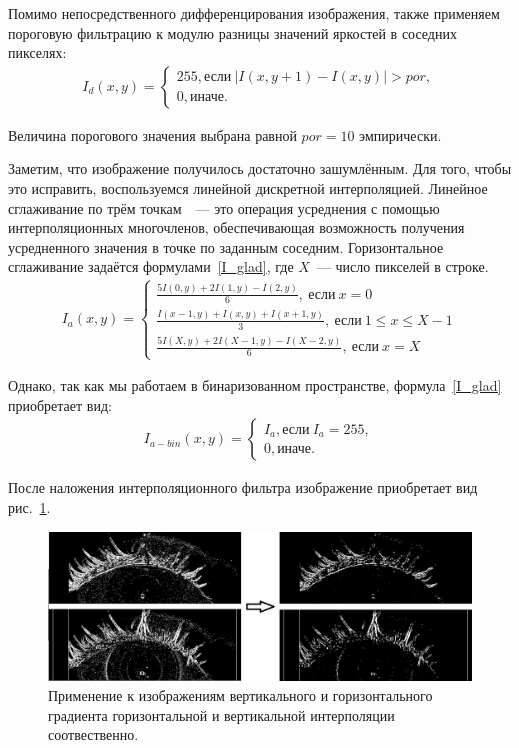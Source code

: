 \documentclass[12pt,a4paper]{article} %
\begin{document}
Помимо непосредственного дифференцирования изображения, также применяем пороговую фильтрацию к модулю разницы значений яркостей в соседних пикселях:
\begin{gather}\label{I_diff}
	 I_d(x,y) = \begin{cases}
	 	255, \text{если}~|I(x,y+1) - I(x,y)|> por,
	 	\\
	 	0, \text{иначе}.
	 \end{cases}
\end{gather}

Величина порогового значения выбрана равной $por=10$ эмпирически.

Заметим, что изображение получилось достаточно зашумлённым. Для того, чтобы это исправить, воспользуемся линейной дискретной интерполяцией. Линейное сглаживание по трём точкам~\cite{Inter}~--- это операция усреднения с помощью интерполяционных многочленов, обеспечивающая возможность получения усредненного значения в точке по заданным соседним. Горизонтальное сглаживание задаётся формулами~\eqref{I_glad}, где $X$~--- число пикселей в строке.
\begin{gather}\label{I_glad}
	I_a(x,y) = \begin{cases}
		\frac{5I(0,y)+2I(1,y)-I(2,y)}{6},~\text{если}~x=0
		\\
		\frac{I(x-1,y)+I(x,y)+I(x+1,y)}{3},~\text{если}~1\leq x\leq X-1
		\\
			\frac{5I(X,y)+2I(X-1,y)-I(X-2,y)}{6},~\text{если}~x=X
	\end{cases}
\end{gather}

Однако, так как мы работаем в бинаризованном пространстве, формула~\eqref{I_glad} приобретает вид:
\begin{gather}\label{I_glad_bin}
	I_{a-bin}(x,y) = \begin{cases}
		I_a, \text{если}~I_a = 255,
		\\
		0, \text{иначе}.
	\end{cases}
\end{gather}

После наложения интерполяционного фильтра изображение приобретает вид рис.~\ref{fig:I_glad}.

\begin{figure}[h]
	
	\centering
	
	\includegraphics[width=0.8\linewidth]{I_glad.jpg}
	
	\caption{Применение к изображениям вертикального и горизонтального градиента горизонтальной и вертикальной интерполяции соотвественно.}
	
	\label{fig:I_glad}
	
\end{figure}
\end{document}
